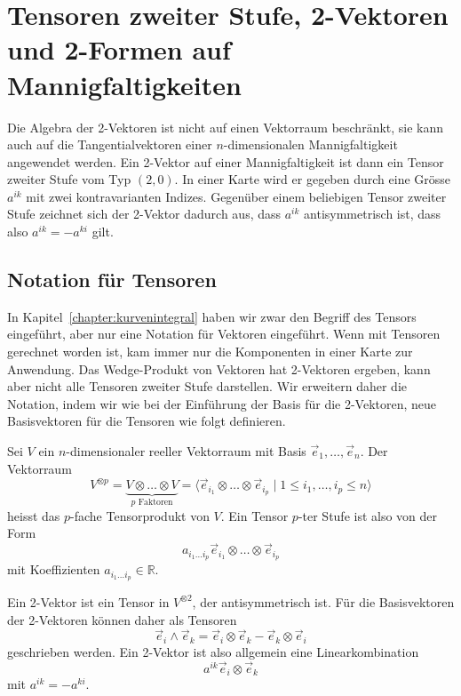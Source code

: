 %
%
\section{Tensoren zweiter Stufe, 2-Vektoren und 2-Formen auf Mannigfaltigkeiten
\label{buch:green:section:2formen}}
%
Die Algebra der 2-Vektoren ist nicht auf einen Vektorraum beschränkt,
sie kann auch auf die Tangentialvektoren einer $n$-dimensionalen
Mannigfaltigkeit angewendet werden.
Ein 2-Vektor auf einer Mannigfaltigkeit ist dann ein Tensor zweiter
Stufe vom Typ $(2,0)$.
In einer Karte wird er gegeben durch eine Grösse $a^{ik}$ mit zwei
kontravarianten Indizes.
Gegenüber einem beliebigen Tensor zweiter Stufe zeichnet sich der 
2-Vektor dadurch aus, dass $a^{ik}$ antisymmetrisch ist, dass also
$a^{ik}=-a^{ki}$ gilt.

%
%
\subsection{Notation für Tensoren}
In Kapitel~\ref{chapter:kurvenintegral} haben wir zwar den Begriff des
Tensors eingeführt, aber nur eine Notation für Vektoren eingeführt.
Wenn mit Tensoren gerechnet worden ist, kam immer nur die Komponenten
in einer Karte zur Anwendung.
Das Wedge-Produkt von Vektoren hat 2-Vektoren ergeben, kann aber
nicht alle Tensoren zweiter Stufe darstellen.
Wir erweitern daher die Notation, indem wir wie bei der Einführung der
Basis für die 2-Vektoren, neue Basisvektoren für die Tensoren wie 
folgt definieren.

\begin{definition}
\label{buch:green:tensoren:definition:tensorprodukt}
Sei $V$ ein $n$-dimensionaler reeller Vektorraum mit Basis
$\vec{e}_1,\dots,\vec{e}_n$.
Der Vektorraum
\[
V^{\otimes p}
=
\underbrace{
V\otimes\dots\otimes V
}_{\displaystyle \text{$p$ Faktoren}}
=
\langle \vec{e}_{i_1}\otimes\dots\otimes \vec{e}_{i_p}
\mid
1\le 
i_1,\dots,i_p
\le n
\rangle
\]
heisst das $p$-fache Tensorprodukt von $V$.
%
Ein Tensor $p$-ter Stufe ist also von der Form
\[
a_{i_1\dots i_p}\vec{e}_{i_1}\otimes\dots\otimes\vec{e}_{i_p}
\]
mit Koeffizienten $a_{i_1\dots i_p}\in\mathbb{R}$.
\end{definition}

Ein 2-Vektor ist ein Tensor in $V^{\otimes 2}$, der antisymmetrisch ist.
Für die Basisvektoren der 2-Vektoren können daher als Tensoren
\[
\vec{e}_i\wedge\vec{e}_k
=
\vec{e}_i\otimes\vec{e}_k
-
\vec{e}_k\otimes\vec{e}_i
\]
geschrieben werden.
Ein 2-Vektor ist also allgemein eine Linearkombination
\begin{equation}
a^{ik}\vec{e}_i\otimes\vec{e}_k
\label{buch:green:tensoren:eqn:2tensor}
\end{equation}
mit $a^{ik}=-a^{ki}$.


